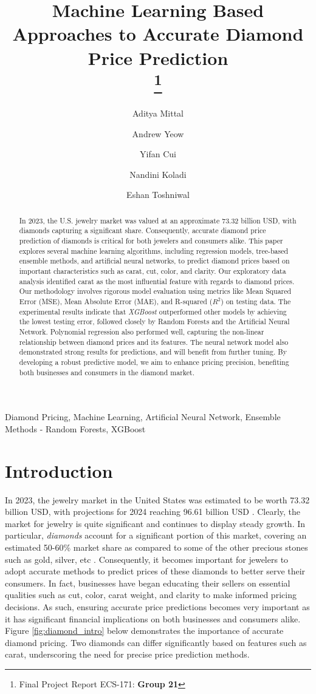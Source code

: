 \documentclass[conference]{IEEEtran}
\title{Machine Learning Based Approaches to Accurate Diamond Price Prediction\\
\thanks{Final Project Report ECS-171: \textbf{Group 21}}
}
\author[1]{Aditya Mittal}
\author[2]{Andrew Yeow}
\author[3]{Yifan Cui}
\author[4]{Nandini Koladi}
\author[5]{Eshan Toshniwal}
\affil[1]{Department of Statistics; University of California, Davis}
\affil[2]{Department of Computer Science; University of California, Davis}
\affil[3]{Department of Computer Science; University of California, Davis}
\affil[4]{Department of Computer Science; University of California, Davis}
\affil[5]{Department of Computer Science; University of California, Davis}
\begin{document}
 
\maketitle

\begin{abstract}
In 2023, the U.S. jewelry market was valued at an approximate 73.32 billion USD, with diamonds capturing a significant share. Consequently, accurate diamond price prediction of diamonds is critical for both jewelers and consumers alike. This paper explores several machine learning algorithms, including regression models, tree-based ensemble methods, and artificial neural networks, to predict diamond prices based on important characteristics such as carat, cut, color, and clarity. Our exploratory data analysis identified carat as the most influential feature with regards to diamond prices. Our methodology involves rigorous model evaluation using metrics like Mean Squared Error (MSE), Mean Absolute Error (MAE), and R-squared ($R^2$) on testing data. The experimental results indicate that \emph{XGBoost} outperformed other models by achieving the lowest testing error, followed closely by Random Forests and the Artificial Neural Network. Polynomial regression also performed well, capturing the non-linear relationship between diamond prices and its features. The neural network model also demonstrated strong results for predictions, and will benefit from further tuning. By developing a robust predictive model, we aim to enhance pricing precision, benefiting both businesses and consumers in the diamond market.
\end{abstract}

\begin{IEEEkeywords}
Diamond Pricing, Machine Learning, Artificial Neural Network, Ensemble Methods - Random Forests, XGBoost
\end{IEEEkeywords}

\section{Introduction}

In 2023, the jewelry market in the United States was estimated to be worth 73.32 billion USD, with projections for 2024 reaching 96.61 billion USD \cite{us}. Clearly, the market for jewelry is quite significant and continues to display steady growth. In particular, \emph{diamonds} account for a significant portion of this market, covering an estimated 50-60\% market share as compared to some of the other precious stones such as gold, silver, etc \cite{diamond}. Consequently, it becomes important for jewelers to adopt accurate methods to predict prices of these diamonds to better serve their consumers. In fact, businesses have began educating their sellers on essential qualities such as cut, color, carat weight, and clarity to make informed pricing decisions. As such, ensuring accurate price predictions becomes very important as it has significant financial implications on both businesses and consumers alike. Figure \ref{fig:diamond_intro} below demonstrates the importance of accurate diamond pricing. Two diamonds can differ significantly based on features such as carat, underscoring the need for precise price prediction methods. 
\end{document}
